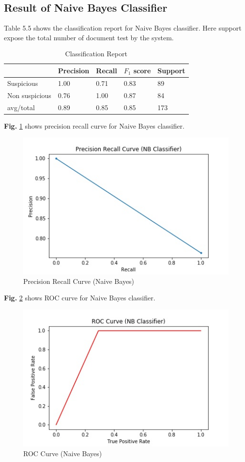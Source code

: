 \documentclass[12pt,a4paper]{report}
\begin{document}
\subsection{Result of Naive Bayes Classifier}
Table 5.5 shows the classification report for Naive Bayes classifier. Here support expose the total number of document test by the system.

\begin{table}[h!]
\begin{center}
\caption{Classification Report}
\begin{tabular}{|m{4.4cm} | m{2cm}| m{2cm}| m{2cm}| m{2cm}|}
\hline
     & Precision & Recall & $F_1$ score & Support \\
\hline
     Suspicious & 1.00 & 0.71 & 0.83 & 89\\
\hline 
     Non suspicious  & 0.76 & 1.00 & 0.87 & 84\\
\hline 
     avg/total & 0.89 & 0.85 & 0.85 & 173\\
\hline
\end{tabular}
\end{center}
\end{table}
\noindent
\textbf{Fig.} \ref{fig:prn} shows precision recall curve for Naive Bayes classifier.

\begin{figure}[h!]
    \centering
    \includegraphics[scale=0.58]{Figures/PRN.jpg}
    \caption{Precision Recall Curve (Naive Bayes)}
    \label{fig:prn}
\end{figure}
\noindent
\textbf{Fig.} \ref{fig:rocn} shows ROC curve for Naive Bayes classifier.

\begin{figure}[h!]
    \centering
    \includegraphics[scale=0.58]{Figures/ROCN.jpg}
    \caption{ROC Curve (Naive Bayes)}
    \label{fig:rocn}
\end{figure}
\end{document}
